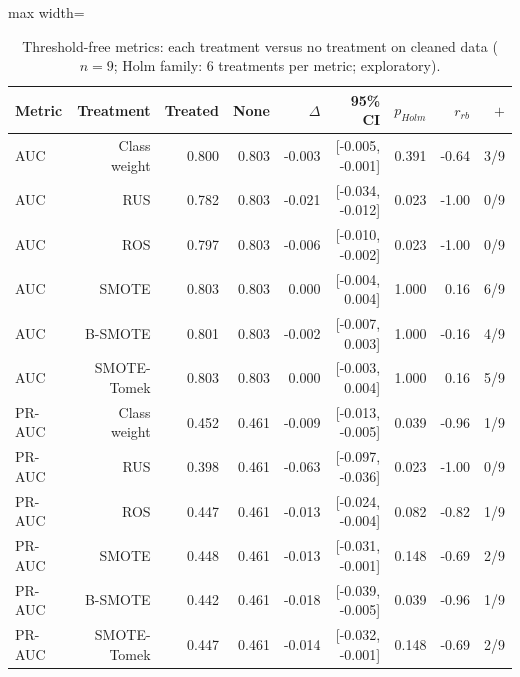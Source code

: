 \begin{table}[t]
\centering
\footnotesize
\caption{Threshold-free metrics: each treatment versus no treatment on cleaned data ($n=9$; Holm family: 6 treatments per metric; exploratory).}
\label{tab:rank}
\begin{adjustbox}{max width=\linewidth}
\begin{tabular}{lrrrrrrrr}
\toprule
Metric & Treatment & Treated & None & $\Delta$ & 95\% CI & $p_{Holm}$ & $r_{rb}$ & $+$ \\
\midrule
AUC & Class weight & 0.800 & 0.803 & -0.003 & [-0.005, -0.001] & 0.391 & -0.64 & 3/9 \\
AUC & RUS & 0.782 & 0.803 & -0.021 & [-0.034, -0.012] & 0.023 & -1.00 & 0/9 \\
AUC & ROS & 0.797 & 0.803 & -0.006 & [-0.010, -0.002] & 0.023 & -1.00 & 0/9 \\
AUC & SMOTE & 0.803 & 0.803 & 0.000 & [-0.004, 0.004] & 1.000 & 0.16 & 6/9 \\
AUC & B-SMOTE & 0.801 & 0.803 & -0.002 & [-0.007, 0.003] & 1.000 & -0.16 & 4/9 \\
AUC & SMOTE-Tomek & 0.803 & 0.803 & 0.000 & [-0.003, 0.004] & 1.000 & 0.16 & 5/9 \\
PR-AUC & Class weight & 0.452 & 0.461 & -0.009 & [-0.013, -0.005] & 0.039 & -0.96 & 1/9 \\
PR-AUC & RUS & 0.398 & 0.461 & -0.063 & [-0.097, -0.036] & 0.023 & -1.00 & 0/9 \\
PR-AUC & ROS & 0.447 & 0.461 & -0.013 & [-0.024, -0.004] & 0.082 & -0.82 & 1/9 \\
PR-AUC & SMOTE & 0.448 & 0.461 & -0.013 & [-0.031, -0.001] & 0.148 & -0.69 & 2/9 \\
PR-AUC & B-SMOTE & 0.442 & 0.461 & -0.018 & [-0.039, -0.005] & 0.039 & -0.96 & 1/9 \\
PR-AUC & SMOTE-Tomek & 0.447 & 0.461 & -0.014 & [-0.032, -0.001] & 0.148 & -0.69 & 2/9 \\
\bottomrule
\end{tabular}
\end{adjustbox}
\end{table}

